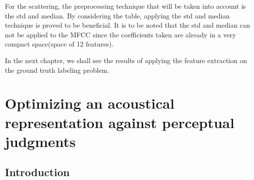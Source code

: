 \documentclass[hidelinks,12pt]{report}
\begin{document}
For the scattering, the preprocessing technique that will be taken into account is the std and median. By considering the table, applying the std and median technique is proved to be beneficial. It is to be noted that the std and median can not be applied to the MFCC since the coefficients taken are already in a very compact space(space of 12 features). \par

In the next chapter, we shall see the results of applying the feature extraction on the ground truth labeling problem.


\chapter{Optimizing an acoustical representation against perceptual judgments}
\section{Introduction}
\end{document}
